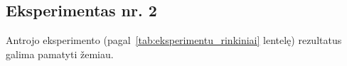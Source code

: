 \subsection{Eksperimentas nr. 2}
\label{subsec:eksperimentas_nr_2}

Antrojo eksperimento (pagal~\ref{tab:eksperimentu_rinkiniai} lentelę) rezultatus galima pamatyti žemiau.

